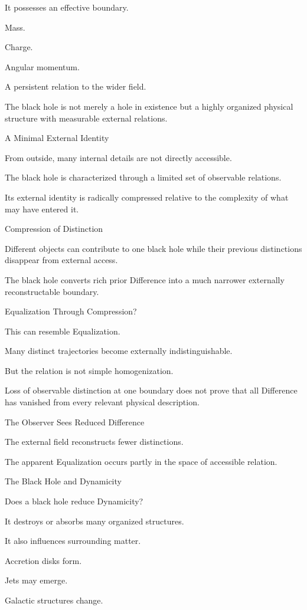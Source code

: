 It possesses an effective boundary.

Mass.

Charge.

Angular momentum.

A persistent relation to the wider field.

The black hole is not merely a hole in existence but a highly organized physical structure with measurable external relations.

A Minimal External Identity

From outside, many internal details are not directly accessible.

The black hole is characterized through a limited set of observable relations.

Its external identity is radically compressed relative to the complexity of what may have entered it.

Compression of Distinction

Different objects can contribute to one black hole while their previous distinctions disappear from external access.

The black hole converts rich prior Difference into a much narrower externally reconstructable boundary.

Equalization Through Compression?

This can resemble Equalization.

Many distinct trajectories become externally indistinguishable.

But the relation is not simple homogenization.

Loss of observable distinction at one boundary does not prove that all Difference has vanished from every relevant physical description.

The Observer Sees Reduced Difference

The external field reconstructs fewer distinctions.

The apparent Equalization occurs partly in the space of accessible relation.

The Black Hole and Dynamicity

Does a black hole reduce Dynamicity?

It destroys or absorbs many organized structures.

It also influences surrounding matter.

Accretion disks form.

Jets may emerge.

Galactic structures change.

